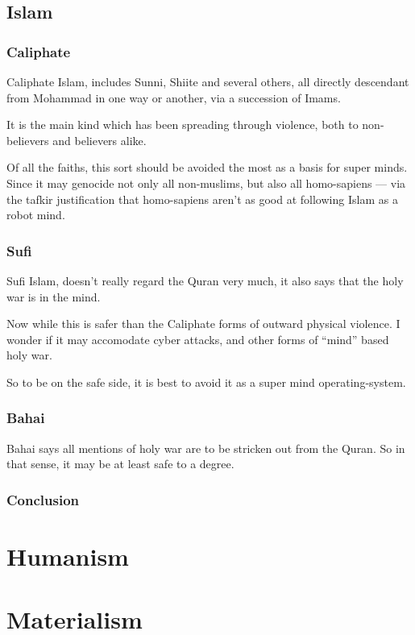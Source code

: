 \section{Islam}
\subsection{Caliphate}
Caliphate Islam, includes Sunni, Shiite and several others,  all directly
descendant from Mohammad in one way or another, via a succession of Imams. 

It is the main kind which has been spreading through violence, both to
non-believers and believers alike. 

Of all the faiths, this sort should be avoided the most as a basis for super
minds.  Since it may genocide not only all non-muslims, but also all
homo-sapiens --- via the tafkir justification that homo-sapiens aren't as good at
following Islam as a robot mind. 

\subsection{Sufi}

Sufi Islam, doesn't really regard the Quran very much,
it also says that the holy war is in the mind. 

Now while this is safer than the Caliphate forms of outward physical violence. 
I wonder if it may accomodate cyber attacks, and other forms of ``mind'' based
holy war. 

So to be on the safe side, it is best to avoid it as a super mind
operating-system.

\subsection{Bahai}

Bahai says all mentions of holy war are to be stricken out from the Quran. 
So in that sense, it may be at least safe to a degree.
\subsection{Conclusion}
\chapter{Humanism}
\chapter{Materialism}
